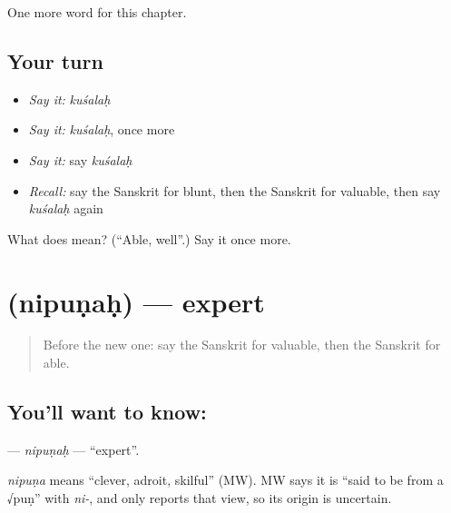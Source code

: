 \begin{grammarlens}[title={What you've built}]
One more word for this chapter.
\end{grammarlens}

\subsection*{Your turn}
\begin{itemize}
\raggedright
  \item \emph{Say it:} \emph{kuśalaḥ}
  \item \emph{Say it:} \emph{kuśalaḥ}, once more
  \item \emph{Say it:} say \emph{kuśalaḥ}
  \item \emph{Recall:} say the Sanskrit for blunt, then the Sanskrit for valuable, then say \emph{kuśalaḥ} again
\end{itemize}

\begin{tcolorbox}[breakable,colback=teal!4,colframe=teal!35!black,title={Before you move on}]
What does  mean? (\textquotedblleft{}Able, well\textquotedblright{}.) Say it once more.
\end{tcolorbox}
\section[\texorpdfstring{\sk{निपुणः} (nipuṇaḥ)}{निपुणः (nipuṇaḥ)}]{ (nipuṇaḥ) — expert}

\label{lesson:SA-C216-nipunah}



\begin{quote}
Before the new one: say the Sanskrit for valuable, then the Sanskrit for able.
\end{quote}

\subsection*{You'll want to know: }
\textbf{} — \emph{nipuṇaḥ} — \textquotedblleft{}expert\textquotedblright{}.

\begin{cousinweb}
\emph{nipuṇa} means \textquotedblleft{}clever, adroit, skilful\textquotedblright{} (MW). MW says it is \textquotedblleft{}said to be from a √puṇ\textquotedblright{} with \emph{ni-}, and only reports that view, so its origin is uncertain.
\end{cousinweb}


